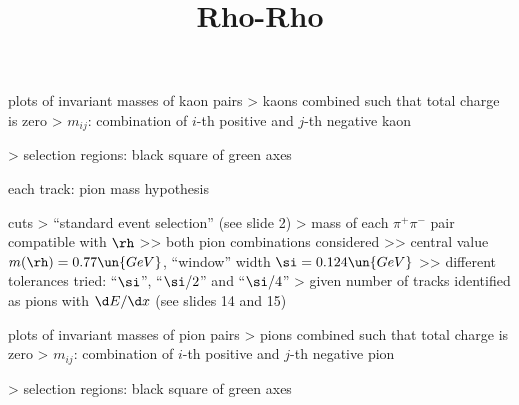 \centerline{}



\newpage %

\> plots of invariant masses of kaon pairs
\>> kaons combined such that total charge is zero
\>> $m_{ij}$: combination of $i$-th positive and $j$-th negative kaon

\centerline{}

\>> selection regions: black square of green axes



\newpage %

\centerline{}



\newpage %
\title{Rho-Rho}

\> each track: pion mass hypothesis

\> cuts
\>> ``standard event selection'' (see slide 2)
\>> mass of each $\pi^+ \pi^-$ pair compatible with $\rh$
\>>> both pion combinations considered
\>>> central value $m(\rh) = 0.77\un{GeV}$, ``window'' width $\si = 0.124\un{GeV}$
\>>> different tolerances tried: ``$\si$'', ``$\si/2$'' and ``$\si/4$''
\>> given number of tracks identified as pions with $\d E/\d x$ (see slides 14 and 15)


\newpage %

\> plots of invariant masses of pion pairs
\>> pions combined such that total charge is zero
\>> $m_{ij}$: combination of $i$-th positive and $j$-th negative pion

\centerline{}

\>> selection regions: black square of green axes


\newpage %

\centerline{}


\newpage %

\centerline{}

\vfil
\eject
\bye
